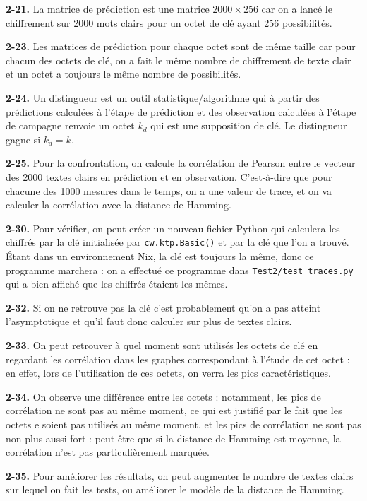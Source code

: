 \documentclass[12pt]{article}
\begin{document}
	\noindent \textbf{2-21.} La matrice de prédiction est une matrice $2000 \times 256$ car on a lancé le chiffrement sur 2000 mots clairs pour un octet de clé ayant 256 possibilités.
	
	\noindent \textbf{2-23.} Les matrices de prédiction pour chaque octet sont de même taille car pour chacun des octets de clé, on a fait le même nombre de chiffrement de texte clair et un octet a toujours le même nombre de possibilités.
	
	\noindent \textbf{2-24.} Un distingueur est un outil statistique/algorithme qui à partir des prédictions calculées à l'étape de prédiction et des observation calculées à l'étape de campagne renvoie un octet $k_d$ qui est une supposition de clé. Le distingueur gagne si $k_d=k$.
	
	\noindent \textbf{2-25.} Pour la confrontation, on calcule la corrélation de Pearson entre le vecteur des 2000 textes clairs en prédiction et en observation. C'est-à-dire que pour chacune des 1000 mesures dans le temps, on a une valeur de trace, et on va calculer la corrélation avec la distance de Hamming.
	
	\noindent \textbf{2-30.} Pour vérifier, on peut créer un nouveau fichier Python qui calculera les chiffrés par la clé initialisée par \verb|cw.ktp.Basic()| et par la clé que l'on a trouvé. \'Etant dans un environnement Nix, la clé est toujours la même, donc ce programme marchera : on a effectué ce programme dans \verb|Test2/test_traces.py| qui a bien affiché que les chiffrés étaient les mêmes.
	
	\noindent \textbf{2-32.} Si on ne retrouve pas la clé c'est probablement qu'on a pas atteint l'asymptotique et qu'il faut donc calculer sur plus de textes clairs.
	
	\noindent \textbf{2-33.} On peut retrouver à quel moment sont utilisés les octets de clé en regardant les corrélation dans les graphes correspondant à l'étude de cet octet : en effet, lors de l'utilisation de ces octets, on verra les pics caractéristiques.
	
	\noindent \textbf{2-34.} On observe une différence entre les octets : notamment, les pics de corrélation ne sont pas au même moment, ce qui est justifié par le fait que les octets e soient pas utilisés au même moment, et les pics de corrélation ne sont pas non plus aussi fort : peut-être que si la distance de Hamming est moyenne, la corrélation n'est pas particulièrement marquée.
	
	\noindent \textbf{2-35.} Pour améliorer les résultats, on peut augmenter le nombre de textes clairs sur lequel on fait les tests, ou améliorer le modèle de la distance de Hamming.
	
\end{document}
